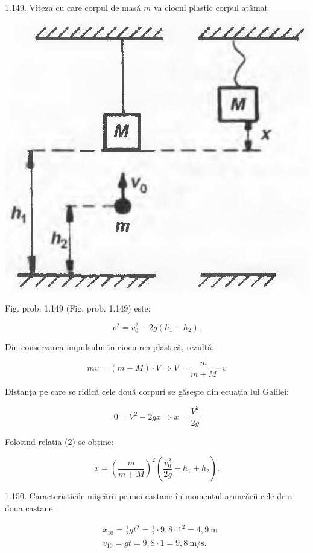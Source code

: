 \documentclass[10pt]{article}
\begin{document}
1.149. Viteza cu care corpul de masă $m$ va ciocni plastic corpul atâmat\\
\includegraphics[max width=\textwidth, center]{2025_07_01_5b3ff9fa0d508c8e9f17g-230}

Fig. prob. 1.149 (Fig. prob. 1.149) este:


\begin{equation*}
v^{2}=v_{0}^{2}-2 g\left(h_{1}-h_{2}\right) . \tag{1}
\end{equation*}


Din conservarea impulsului în ciocnirea plastică, rezultă:


\begin{equation*}
m v=(m+M) \cdot V \Rightarrow V=\frac{m}{m+M} \cdot v \tag{2}
\end{equation*}


Distanța pe care se ridică cele două corpuri se găseşte din ecuația lui Galilei:

$$
0=V^{2}-2 g x \Rightarrow x=\frac{V^{2}}{2 g}
$$

Folosind relația (2) se obține:

$$
x=\left(\frac{m}{m+M}\right)^{2}\left(\frac{v_{0}^{2}}{2 g}-h_{1}+h_{2}\right) .
$$

1.150. Caracteristicile mişcării primei castane în momentul aruncării cele de-a doua castane:

$$
\begin{aligned}
& x_{10}=\frac{1}{2} g t^{2}=\frac{1}{2} \cdot 9,8 \cdot 1^{2}=4,9 \mathrm{~m} \\
& v_{10}=g t=9,8 \cdot 1=9,8 \mathrm{~m} / \mathrm{s} .
\end{aligned}
$$
\end{document}

